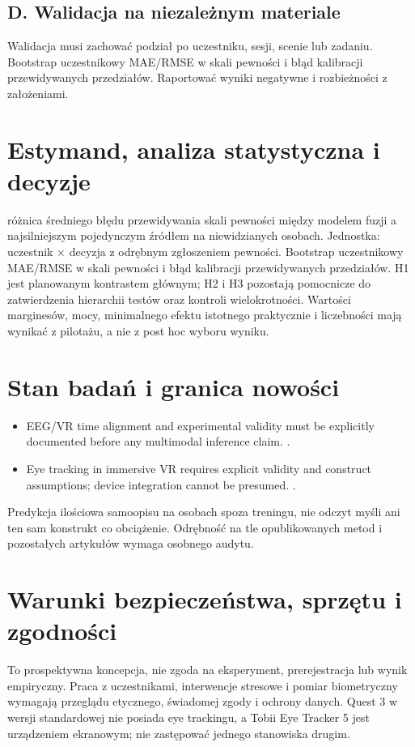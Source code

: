 \documentclass[11pt,a4paper]{article}
\begin{document}
\subsection{D. Walidacja na niezależnym materiale}
Walidacja musi zachować podział po uczestniku, sesji, scenie lub zadaniu. Bootstrap uczestnikowy MAE/RMSE w skali pewności i błąd kalibracji przewidywanych przedziałów. Raportować wyniki negatywne i rozbieżności z założeniami.
\section{Estymand, analiza statystyczna i decyzje}
różnica średniego błędu przewidywania skali pewności między modelem fuzji a najsilniejszym pojedynczym źródłem na niewidzianych osobach. Jednostka: uczestnik × decyzja z odrębnym zgłoszeniem pewności. Bootstrap uczestnikowy MAE/RMSE w skali pewności i błąd kalibracji przewidywanych przedziałów. H1 jest planowanym kontrastem głównym; H2 i H3 pozostają pomocnicze do zatwierdzenia hierarchii testów oraz kontroli wielokrotności. Wartości marginesów, mocy, minimalnego efektu istotnego praktycznie i liczebności mają wynikać z pilotażu, a nie z post hoc wyboru wyniku.
\section{Stan badań i granica nowości}
\begin{itemize}
\item EEG/VR time alignment and experimental validity must be explicitly documented before any multimodal inference claim. \cite{xrprior1}.
\item Eye tracking in immersive VR requires explicit validity and construct assumptions; device integration cannot be presumed. \cite{xrprior2}.
\end{itemize}
Predykcja ilościowa samoopisu na osobach spoza treningu, nie odczyt myśli ani ten sam konstrukt co obciążenie. Odrębność na tle opublikowanych metod i pozostałych artykułów wymaga osobnego audytu.
\section{Warunki bezpieczeństwa, sprzętu i zgodności}
To prospektywna koncepcja, nie zgoda na eksperyment, prerejestracja lub wynik empiryczny. Praca z uczestnikami, interwencje stresowe i pomiar biometryczny wymagają przeglądu etycznego, świadomej zgody i ochrony danych. Quest 3 w wersji standardowej nie posiada eye trackingu, a Tobii Eye Tracker 5 jest urządzeniem ekranowym; nie zastępować jednego stanowiska drugim.
\end{document}

